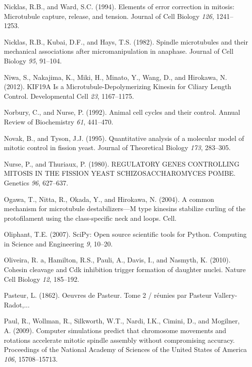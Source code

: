 \documentclass[12pt,a4paper,twoside,openright]{book}
\begin{document}
\hypertarget{ref-Nicklas1994}{}
Nicklas, R.B., and Ward, S.C. (1994). Elements of error correction in
mitosis: Microtubule capture, release, and tension. Journal of Cell
Biology \emph{126}, 1241--1253.

\hypertarget{ref-Nicklas1982}{}
Nicklas, R.B., Kubai, D.F., and Hays, T.S. (1982). Spindle microtubules
and their mechanical associations after micromanipulation in anaphase.
Journal of Cell Biology \emph{95}, 91--104.

\hypertarget{ref-Niwa2012}{}
Niwa, S., Nakajima, K., Miki, H., Minato, Y., Wang, D., and Hirokawa, N.
(2012). KIF19A Is a Microtubule-Depolymerizing Kinesin for Ciliary
Length Control. Developmental Cell \emph{23}, 1167--1175.

\hypertarget{ref-Norbury1992}{}
Norbury, C., and Nurse, P. (1992). Animal cell cycles and their control.
Annual Review of Biochemistry \emph{61}, 441--470.

\hypertarget{ref-Novak1995}{}
Novak, B., and Tyson, J.J. (1995). Quantitative analysis of a molecular
model of mitotic control in fission yeast. Journal of Theoretical
Biology \emph{173}, 283--305.

\hypertarget{ref-Nurse1980}{}
Nurse, P., and Thuriaux, P. (1980). REGULATORY GENES CONTROLLING MITOSIS
IN THE FISSION YEAST SCHIZOSACCHAROMYCES POMBE. Genetics \emph{96},
627--637.

\hypertarget{ref-Ogawa2004}{}
Ogawa, T., Nitta, R., Okada, Y., and Hirokawa, N. (2004). A common
mechanism for microtubule destabilizers---M type kinesins stabilize
curling of the protofilament using the class-specific neck and loops.
Cell.

\hypertarget{ref-Oliphant2007}{}
Oliphant, T.E. (2007). SciPy: Open source scientific tools for Python.
Computing in Science and Engineering \emph{9}, 10--20.

\hypertarget{ref-Oliveira2010}{}
Oliveira, R. a, Hamilton, R.S., Pauli, A., Davis, I., and Nasmyth, K.
(2010). Cohesin cleavage and Cdk inhibition trigger formation of
daughter nuclei. Nature Cell Biology \emph{12}, 185--192.

\hypertarget{ref-Pasteur}{}
Pasteur, L. (1862). Oeuvres de Pasteur. Tome 2 / réunies par Pasteur
Vallery-Radot,...

\hypertarget{ref-Paul2009}{}
Paul, R., Wollman, R., Silkworth, W.T., Nardi, I.K., Cimini, D., and
Mogilner, A. (2009). Computer simulations predict that chromosome
movements and rotations accelerate mitotic spindle assembly without
compromising accuracy. Proceedings of the National Academy of Sciences
of the United States of America \emph{106}, 15708--15713.
\end{document}
